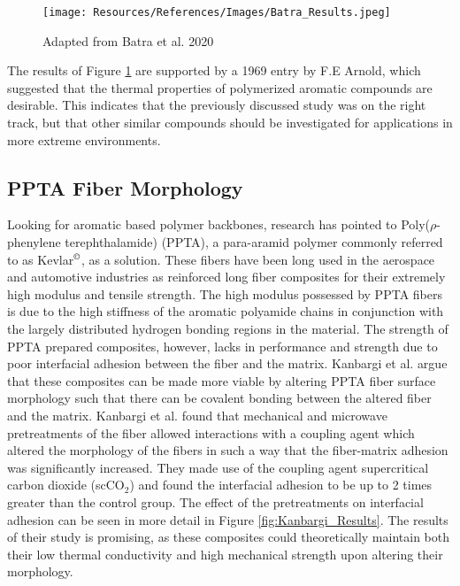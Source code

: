 \documentclass[12pt]{article}
\begin{document}
\begin{multicols}{2}
\begin{figure}[H]
    \centering
    \texttt{[image: Resources/References/Images/Batra\_Results.jpeg]}
    \caption{\scriptsize{Adapted from Batra et al. 2020 \citep{Batra2020}}}
    \label{fig:Batra_Results}
\end{figure}

\indent The results of Figure \ref{fig:Batra_Results} are supported by a 1969 entry by F.E Arnold, which suggested that the thermal properties of polymerized aromatic compounds are desirable. \citep{Arnold1969} This indicates that the previously discussed study was on the right track, but that other similar compounds should be investigated for applications in more extreme environments.

\subsection{PPTA Fiber Morphology}

\vspace{-0.4em}

\indent Looking for aromatic based polymer backbones, research has pointed to Poly($\rho$-phenylene terephthalamide) (PPTA), a para-aramid polymer commonly referred to as Kevlar$^{\text{\textcopyright}}$, as a solution. \citep{Liu2019} These fibers have been long used in the aerospace and automotive industries as reinforced long fiber composites for their extremely high modulus and tensile strength. \cite{Cheng2005} The high modulus possessed by PPTA fibers is due to the high stiffness of the aromatic polyamide chains in conjunction with the largely distributed hydrogen bonding regions in the material. \citep{Wang2020} The strength of PPTA prepared composites, however, lacks in performance and strength due to poor interfacial adhesion between the fiber and the matrix. \citep{Kanbargi2017} Kanbargi et al. \citep{Kanbargi2017} argue that these composites can be made more viable by altering PPTA fiber surface morphology such that there can be covalent bonding between the altered fiber and the matrix. Kanbargi et al. \citep{Kanbargi2017} found that mechanical and microwave pretreatments of the fiber allowed interactions with a coupling agent which altered the morphology of the fibers in such a way that the fiber-matrix adhesion was significantly increased. They made use of the coupling agent supercritical carbon dioxide (scCO$_2$) and found the interfacial adhesion to be up to 2 times greater than the control group. \citep{Kanbargi2017} The effect of the pretreatments on interfacial adhesion can be seen in more detail in Figure \ref{fig:Kanbargi_Results}. The results of their study is promising, as these composites could theoretically maintain both their low thermal conductivity and high mechanical strength upon altering their morphology.


\end{multicols}
\end{document}
